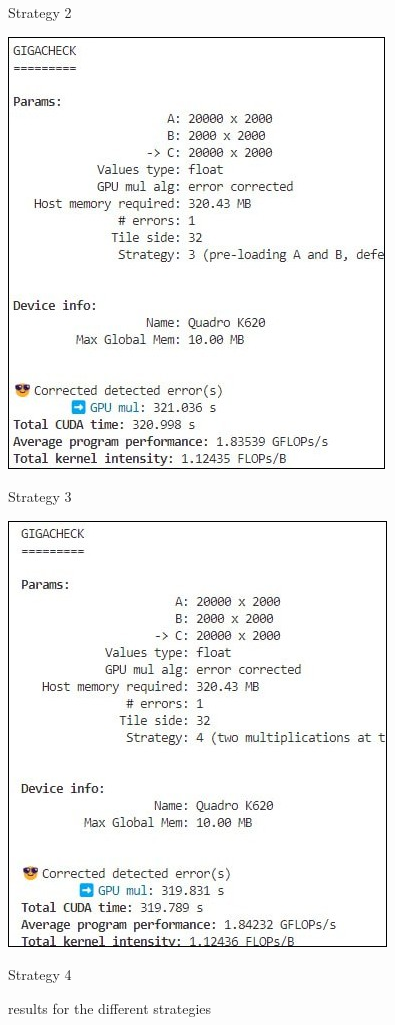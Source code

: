 \begin{figure}[h]
	\caption*{Strategy 2}
	\endminipage\hfill
	\linebreak
	\vspace{.02\textwidth}
	\linebreak
	\includegraphics[width=\textwidth]{images/result_s3}
	\caption*{Strategy 3}
	\endminipage\hfill
	\includegraphics[width=\textwidth]{images/result_s4}
	\caption*{Strategy 4}
	\endminipage\hfill
	\caption{\centering results for the different strategies}\label{immediate-users-interviews}
\end{figure}

